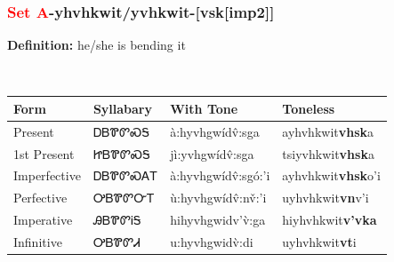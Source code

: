 \subsubsection*{\textcolor{Red}{Set A}{-}\textbf{yhvhkwit/yvhkwit}{-}[vsk[imp2]]}
\nopagebreak
\textbf{Definition: } he/she is bending it
\\[0.5em]
\begin{tabularx}{\textwidth}{l X X X}%
\toprule%
\textbf{Form}&\textbf{Syllabary}&\textbf{With Tone}&\textbf{Toneless}\\%
\midrule%
Present&ᎠᏴᏈᏛᏍᎦ&à:hyvhgwídv̂:sga&ayhvhkwit\textbf{vhsk}a\\%
1st Present&ᏥᏴᏈᏛᏍᎦ&jì:yvhgwídv̂:sga&tsiyvhkwit\textbf{vhsk}a\\%
Imperfective&ᎠᏴᏈᏛᏍᎪᎢ&à:hyvhgwídv̂:sgó:’i&ayhvhkwit\textbf{vhsk}o'i\\%
Perfective&ᎤᏴᏈᏛᏅᎢ&ù:hyvhgwídv̂:nv̌:’i&uyhvhkwit\textbf{vn}v'i\\%
Imperative&ᎯᏴᏈᏛᎥᎦ&hihyvhgwidv’v̀:ga&hiyhvhkwit\textbf{v'vka}\\%
Infinitive&ᎤᏴᏈᏛᏗ&u:hyvhgwidv̀:di&uyhvhkwit\textbf{vt}i\\%
\bottomrule%
\end{tabularx}
\\[1em]